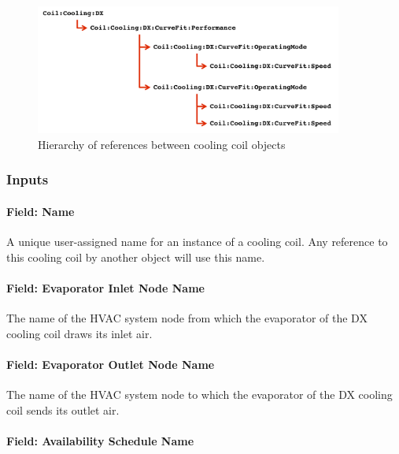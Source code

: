 \begin{figure}[hbtp] %
\centering
\includegraphics[width=0.9\textwidth, height=0.9\textheight, keepaspectratio=true]{media/cooling-coil-hierarchy.png}
\caption{Hierarchy of references between cooling coil objects \protect \label{fig:diagram-of-coil-object-references}}
\end{figure}

\subsubsection{Inputs}\label{inputs-01}

\paragraph{Field: Name}\label{field-name-01}

A unique user-assigned name for an instance of a cooling coil. Any reference to this cooling coil by another object will use this name.

\paragraph{Field: Evaporator Inlet Node Name}\label{field-evaporator-inlet-node-name-021}

The name of the HVAC system node from which the evaporator of the DX cooling coil draws its inlet air.

\paragraph{Field: Evaporator Outlet Node Name}\label{field-evaporator-outlet-node-name-021}

The name of the HVAC system node to which the evaporator of the DX cooling coil sends its outlet air.

\paragraph{Field: Availability Schedule Name}\label{field-availability-schedule-name-6-001}

